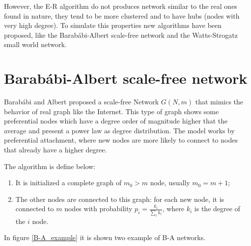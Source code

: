 However, the E-R algorithm do not produces network similar to the real ones found in nature, they tend to be more clustered and to have hubs (nodes with very high degree). To simulate this properties new algorithms have been proposed, like the Barab\'abi-Albert scale-free network and the Watts-Strogatz small world network.

\section{Barab\'abi-Albert scale-free network}
Barab\'abi and Albert proposed a scale-free Network $G(N, m)$ \cite{Barabasi_Albert_1999} that mimics the behavior of real graph like the Internet. This type of graph shows some preferential nodes which have a degree order of magnitude higher that the average and present a power law as degree distribution.
The model works by preferential attachment, where new nodes are more likely to connect to nodes that already have a higher degree. 

The algorithm is define below:
\begin{enumerate}
    \item It is initialized a complete graph of $m_0 > m$ node, usually $m_0 = m+1$;
    \item The other nodes are connected to this graph: for each new node, it is connected to $m$ nodes with probability $p_i = \frac{k_i}{\sum_i k_i}$, where $k_i$ is the degree of the $i$ node.
\end{enumerate}
In figure \ref{B-A_example} it is shown two example of B-A networks.

